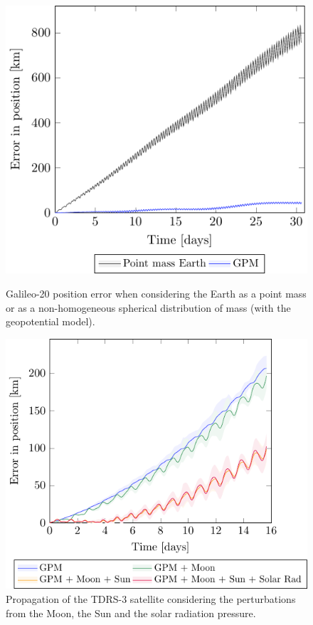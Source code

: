 \documentclass[../main.tex]{subfiles}
\begin{document}
\begin{figure}[ht]
  \centering
  \begin{minipage}[ht]{0.45\textwidth}
    \centering
    \includegraphics[width=\textwidth]{Images/simulation/GALILEO_pointMass_comparison.pdf}
    \caption{Galileo-20 position error when considering the Earth as a point mass or as a non-homogeneous spherical distribution of mass (with the geopotential model).}
    \label{fig:Galileo_point}
  \end{minipage}
  \hspace{0.0333333\textwidth}
  \begin{minipage}[ht]{0.45\textwidth}
    \centering
    \includegraphics[width=\textwidth]{Images/simulation/TDRS-3.pdf}
    \caption{Propagation of the TDRS-3 satellite considering the perturbations from the Moon, the Sun and the solar radiation pressure.}
    \label{fig:TDRS}
  \end{minipage}
\end{figure}
\end{document}
